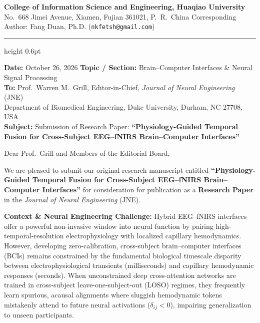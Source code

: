 \documentclass[10pt,a4paper]{article}
\begin{document}
\thispagestyle{empty}

\noindent
\textbf{College of Information Science and Engineering, Huaqiao University}\\
{\small No.~668 Jimei Avenue, Xiamen, Fujian 361021, P.~R.~China \hfill Corresponding Author: Fang Duan, Ph.D. (\texttt{nkfetsh@gmail.com})}
\vspace{0.2ex}
\hrule height 0.6pt
\vspace{0.4ex}

\noindent
\textbf{Date:} October 26, 2026 \hfill \textbf{Topic / Section:} Brain--Computer Interfaces \& Neural Signal Processing\\[0.3ex]
\textbf{To:} Prof.~Warren M.~Grill, Editor-in-Chief, \textit{Journal of Neural Engineering} (JNE)\\
 Department of Biomedical Engineering, Duke University, Durham, NC 27708, USA\\[0.3ex]
\textbf{Subject:} Submission of Research Paper: \textbf{``Physiology-Guided Temporal Fusion for Cross-Subject EEG--fNIRS Brain--Computer Interfaces''}

\vspace{0.4ex}
\noindent Dear Prof.~Grill and Members of the Editorial Board,

\smallskip
We are pleased to submit our original research manuscript entitled \textbf{``Physiology-Guided Temporal Fusion for Cross-Subject EEG--fNIRS Brain--Computer Interfaces''} for consideration for publication as a \textbf{Research Paper} in the \textit{Journal of Neural Engineering} (JNE).

\smallskip
\noindent\textbf{Context \& Neural Engineering Challenge:}
Hybrid EEG--fNIRS interfaces offer a powerful non-invasive window into neural function by pairing high-temporal-resolution electrophysiology with localized capillary hemodynamics. However, developing zero-calibration, cross-subject brain--computer interfaces (BCIs) remains constrained by the fundamental biological timescale disparity between electrophysiological transients (milliseconds) and capillary hemodynamic responses (seconds). When unconstrained deep cross-attention networks are trained in cross-subject leave-one-subject-out (LOSO) regimes, they frequently learn spurious, acausal alignments where sluggish hemodynamic tokens mistakenly attend to future neural activations ($\delta_{ij} < 0$), impairing generalization to unseen participants.
\end{document}
